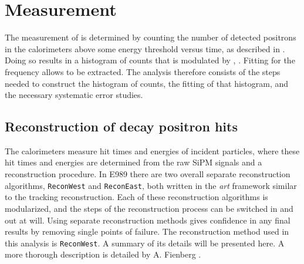 
\thispagestyle{myheadings}

\graphicspath{{Body/Figures/Wa/Temporary/}{Body/Figures/Wa/Temporary/FitResiduals/}{Body/Figures/Wa/Reconstruction/}{Body/Figures/Wa/Histogramming/}{Body/Figures/Wa/Pileup/}{Body/Figures/Wa/Pileup/TimeAndEnergySpectra/}{Body/Figures/Wa/Pileup/Scaling/}{Body/Figures/Wa/RatioAnalysis/}{Body/Figures/Wa/RatioAnalysis/MethodOverview/}{Body/Figures/Wa/RatioAnalysis/VW_Studies/}{Body/Figures/Wa/Datasets/Endgame/LostMuonFiles/MainCuts/}{Body/Figures/Wa/Datasets/ComparisonPlots/LostMuons/}{Body/Figures/Wa/Datasets/60h/SingleIteration/SingleFits/}{Body/Figures/Wa/Datasets/9d/EnergyThreshold/}}

\chapter{\texorpdfstring{\wa}{wa} Measurement}
\label{chapter:wa}


The measurement of \wa is determined by counting the number of detected positrons in the calorimeters above some energy threshold versus time, as described in . Doing so results in a histogram of counts that is modulated by \wa, . Fitting for the frequency allows \wa to be extracted. The \wa analysis therefore consists of the steps needed to construct the histogram of counts, the fitting of that histogram, and the necessary systematic error studies.


\section{Reconstruction of decay positron hits}
\label{sec:ReconWest}


The calorimeters measure hit times and energies of incident particles, where these hit times and energies are determined from the raw SiPM signals and a reconstruction procedure. In E989 there are two overall separate reconstruction algorithms, \texttt{ReconWest} and \texttt{ReconEast}, both written in the \textit{art} framework similar to the tracking reconstruction. Each of these reconstruction algorithms is modularized, and the steps of the reconstruction process can be switched in and out at will. Using separate reconstruction methods gives confidence in any final results by removing single points of failure. The reconstruction method used in this analysis is \texttt{ReconWest}. A summary of its details will be presented here. A more thorough description is detailed by A. Fienberg \cite{AFThesis}.


